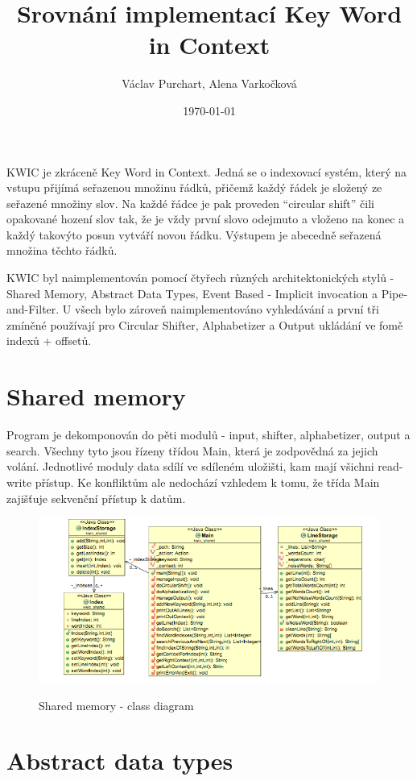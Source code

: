 \documentclass[11pt]{article}
\title{Srovnání implementací Key Word in Context}
\author{Václav Purchart, Alena Varkočková}
\date{\today}
\begin{document}
\maketitle

KWIC je zkráceně Key Word in Context. Jedná se o indexovací systém, který na vstupu přijímá seřazenou množinu řádků, přičemž každý řádek je složený ze seřazené množiny slov. Na každé řádce je pak proveden “circular shift” čili opakované hození slov tak, že je vždy první slovo odejmuto a vloženo na konec a každý takovýto posun vytváří novou řádku. Výstupem je abecedně seřazená množina těchto řádků.

KWIC byl naimplementován pomocí čtyřech různých architektonických stylů - Shared Memory, Abstract Data Types, Event Based - Implicit invocation a Pipe-and-Filter. U všech bylo zároveň naimplementováno vyhledávání a první tři zmíněné používají pro Circular Shifter, Alphabetizer a Output ukládání ve fomě indexů + offsetů.

\section{Shared memory}

Program je dekomponován do pěti modulů - input, shifter, alphabetizer, output a search. Všechny tyto jsou řízeny třídou Main, která je zodpovědná za jejich volání. Jednotlivé moduly data sdílí ve sdíleném uložišti, kam mají všichni read-write přístup. Ke konfliktům ale nedochází vzhledem k tomu, že třída Main zajišťuje sekvenční přístup k datům.

\begin{figure}[htbp]
	\caption{Shared memory - class diagram}
		\includegraphics[width=13cm]{shared}
	\label{fig:shared}
\end{figure}

\section{Abstract data types}
\end{document}
